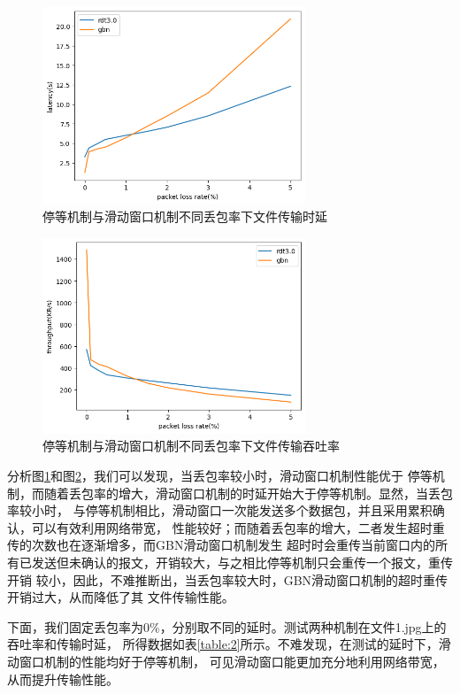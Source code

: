 \documentclass[a4paper]{article}
\begin{document}
\begin{figure}[H]
  \centering
  \includegraphics[width=0.7\textwidth]{f6.jpg}
  \caption{停等机制与滑动窗口机制不同丢包率下文件传输时延}
  \label{fig:7}
\end{figure}

\begin{figure}[H]
  \centering
  \includegraphics[width=0.7\textwidth]{f7.jpg}
  \caption{停等机制与滑动窗口机制不同丢包率下文件传输吞吐率}
  \label{fig:8}
\end{figure}

分析图\ref{fig:7}和图\ref{fig:8}，我们可以发现，当丢包率较小时，滑动窗口机制性能优于
停等机制，而随着丢包率的增大，滑动窗口机制的时延开始大于停等机制。显然，当丢包率较小时，
与停等机制相比，滑动窗口一次能发送多个数据包，并且采用累积确认，可以有效利用网络带宽，
性能较好；而随着丢包率的增大，二者发生超时重传的次数也在逐渐增多，而GBN滑动窗口机制发生
超时时会重传当前窗口内的所有已发送但未确认的报文，开销较大，与之相比停等机制只会重传一个报文，重传开销
较小，因此，不难推断出，当丢包率较大时，GBN滑动窗口机制的超时重传开销过大，从而降低了其
文件传输性能。

下面，我们固定丢包率为0\%，分别取不同的延时。测试两种机制在文件1.jpg上的吞吐率和传输时延，
所得数据如表\ref{table:2}所示。不难发现，在测试的延时下，滑动窗口机制的性能均好于停等机制，
可见滑动窗口能更加充分地利用网络带宽，从而提升传输性能。
\end{document}
